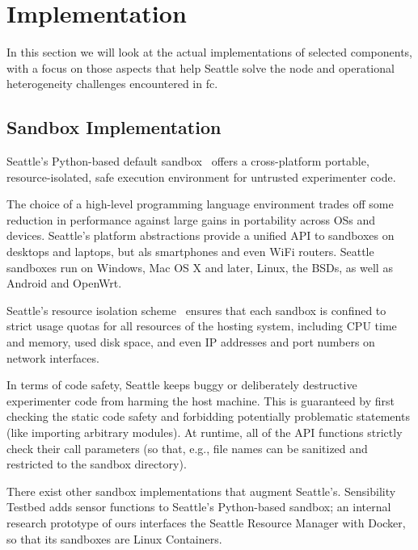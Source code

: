 \section{Implementation}

In this section we will look at the actual implementations of
selected components, with a focus on those aspects that help
Seattle solve the node and operational heterogeneity
challenges encountered in \gls{fc}.

\subsection{Sandbox Implementation}

Seattle's Python-based default sandbox~\cite{RepySandbox}
offers a cross-platform portable, resource-isolated,
safe execution environment for untrusted experimenter code.

The choice of a high-level programming language environment trades
off some reduction in performance against large gains in portability
across \glspl{OS} and devices. Seattle's platform abstractions
provide a unified \gls{API} to sandboxes on desktops and laptops,
but als smartphones and even WiFi routers. Seattle sandboxes
run on Windows, Mac OS X and later, Linux, the \glspl{BSD}, as
well as Android and OpenWrt.

Seattle's resource isolation scheme~\cite{li2015fence} ensures
that each sandbox is confined to strict usage quotas for all
resources of the hosting system, including \gls{CPU} time and
memory, used disk space, and even \gls{IP} addresses and port numbers
on network interfaces.

In terms of code safety, Seattle keeps buggy or deliberately destructive
experimenter code from harming the host machine. This is guaranteed
by first checking the static code safety and forbidding potentially
problematic statements (like importing arbitrary modules). At runtime,
all of the \gls{API} functions strictly check their call parameters
(so that, e.g., file names can be sanitized and restricted to the
sandbox directory).

There exist other sandbox implementations that augment Seattle's.
Sensibility Testbed adds sensor functions to Seattle's Python-based
sandbox; an internal research prototype of ours interfaces the
Seattle Resource Manager with Docker, so that its sandboxes are
Linux Containers.



